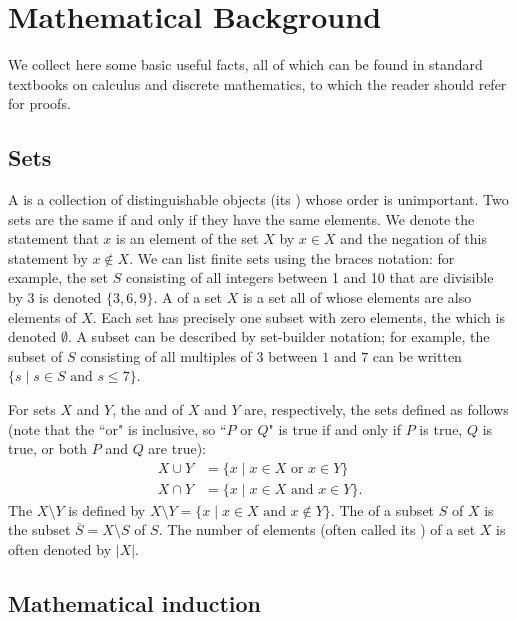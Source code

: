 \chapter{Mathematical Background}
\label{ch:app:mathtools}

We collect here some basic useful facts, all of which can be found in 
standard textbooks 
on calculus and discrete mathematics, to which the reader should refer for proofs.

\section{Sets}
\label{sec:app:sets}

A  is a collection of distinguishable objects  
(its ) whose order is 
unimportant. Two sets are the same if and only if they have the same elements.
We denote the statement that $x$ is an element of the set $X$ by $x\in X$ and the 
negation of this statement by $x\not\in X$.
We can list finite sets using the braces notation: for example, the set $S$ 
consisting 
of all integers between 1 and 10 that are divisible by 3 is denoted $\{3, 6, 9\}$. 
A  of a set $X$ is a set all of whose elements are also elements of 
$X$. Each set has precisely one subset with zero elements, the  
which is denoted $\emptyset$. A subset can be described by 
set-builder notation; 
for example, the subset of $S$ consisting of 
all multiples of $3$ between $1$ and $7$ can be written
$\{s \mid s \in S \text { and } s \leq 7\}$.

For sets $X$ and $Y$, the  and  
of $X$ and $Y$ are, respectively, the sets defined as follows
(note that the ``or" is inclusive, so ``$P$ or $Q$" is true if and only if $P$ is true, $Q$ is true, or both $P$ and $Q$ are true):
\begin{align*}
X \cup Y&= \{x \mid x \in X \text{ or } x \in Y\}\\
X \cap Y&=\{x \mid x \in X \text{ and } x \in Y\}.
\end{align*}
The  $X\setminus Y$ is defined by 
$X\setminus Y = \{x \mid x\in X \text{ and } x\not\in Y\}$.
The  of a subset $S$ of $X$ is the subset 
$\overline{S} = X\setminus S$ of $S$.  The number of elements
(often called its ) of
a set $X$ is often denoted by $|X|$.

\section{Mathematical induction}
\label{sec:app:ind}

